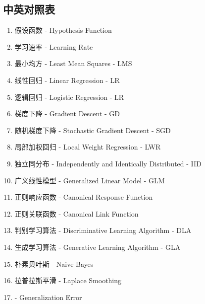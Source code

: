 \subsection{中英对照表}
\begin{enumerate}
	\item 假设函数 - Hypothesis Function
	\item 学习速率 - Learning Rate
	\item 最小均方 - Least Mean Squares - LMS
	\item 线性回归 - Linear Regression - LR
	\item 逻辑回归 - Logistic Regression - LR
	\item 梯度下降 - Gradient Descent - GD
	\item 随机梯度下降 - Stochastic Gradient Descent - SGD
	\item 局部加权回归 - Local Weight Regression - LWR
	\item 独立同分布 - Independently and Identically Distributed - IID
	\item 广义线性模型 - Generalized Linear Model - GLM
	\item 正则响应函数 - Canonical Response Function
	\item 正则关联函数 - Canonical Link Function
	\item 判别学习算法 - Discriminative Learning Algorithm - DLA
	\item 生成学习算法 - Generative Learning Algorithm - GLA
	\item 朴素贝叶斯 - Naive Bayes
	\item 拉普拉斯平滑 - Laplace Smoothing
	\item  - Generalization Error
\end{enumerate}